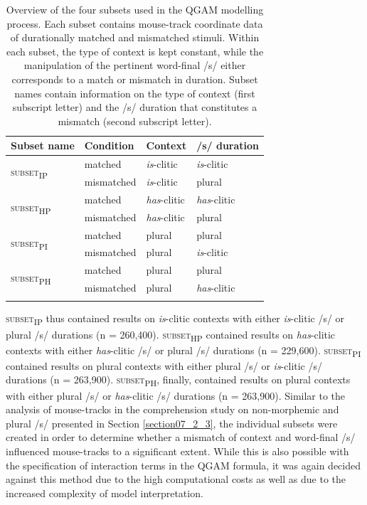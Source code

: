 \begin{table}\fontsize{10}{11}
\caption{Overview of the four subsets used in the QGAM modelling process. Each subset contains mouse-track coordinate data of durationally matched and mismatched stimuli. Within each subset, the type of context is kept constant, while the manipulation of the pertinent word-final /s/ either corresponds to a match or mismatch in duration. Subset names contain information on the type of context (first subscript letter) and the /s/ duration that constitutes a mismatch (second subscript letter).}
\label{tab:8.4}
\centering
\begin{tabular}{llll} 
\lsptoprule
Subset name               & Condition  & Context             & /s/ duration           \\ 
\midrule
\multirow{2}{*}{\textsc{subset\textsubscript{IP}}} & matched    & \textit{is}-clitic  & \textit{is}-clitic   \\
                          & mismatched & \textit{is}-clitic  & plural               \\ 
\midrule
\multirow{2}{*}{\textsc{subset\textsubscript{HP}}} & matched    & \textit{has}-clitic & \textit{has}-clitic  \\
                          & mismatched & \textit{has}-clitic & plural               \\ 
\midrule
\multirow{2}{*}{\textsc{subset\textsubscript{PI}}} & matched    & plural              & plural               \\
                          & mismatched & plural              & \textit{is}-clitic   \\ 
\midrule
\multirow{2}{*}{\textsc{subset\textsubscript{PH}}} & matched    & plural              & plural               \\
                          & mismatched & plural              & \textit{has}-clitic  \\
\lspbottomrule
\end{tabular}
\end{table}

\textsc{subset\textsubscript{IP}} thus contained results on \textit{is}-clitic contexts with either \textit{is}-clitic /s/ or plural /s/ durations (n = 260,400). \textsc{subset\textsubscript{HP}} contained results on \textit{has}-clitic contexts with either \textit{has}-clitic /s/ or plural /s/ durations (n = 229,600). \textsc{subset\textsubscript{PI}} contained results on plural contexts with either plural /s/ or \textit{is}-clitic /s/ durations (n = 263,900). \textsc{subset\textsubscript{PH}}, finally, contained results on plural contexts with either plural /s/ or \textit{has}-clitic /s/ durations (n = 263,900). Similar to the analysis of mouse-tracks in the comprehension study on non-morphemic and plural /s/ presented in Section \ref{section07_2_3}, the individual subsets were created in order to determine whether a mismatch of context and word-final /s/ influenced mouse-tracks to a significant extent. While this is also possible with the specification of interaction terms in the QGAM formula, it was again decided against this method due to the high computational costs as well as due to the increased complexity of model interpretation. 

